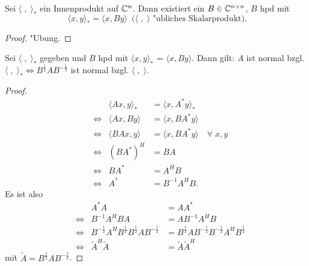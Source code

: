 %
\begin{lem}
 Sei $\langle \; , \; \rangle_*$ ein Innenprodukt auf  $\mathbb{C}^{n}$.
 Dann existiert ein $B \in \mathbb{C}^{n\times n}$, $B$ hpd mit
\[\langle x , y \rangle_* = \langle x,B y \rangle \enspace (\mbox{$\langle \; , \; \rangle$ "ubliches Skalarprodukt).} \]
\end{lem}
\begin{proof}
 "Ubung.
\end{proof}
%
\begin{sa}
 Sei $\langle \; , \; \rangle_*$ gegeben und $B$ hpd mit $\langle x, y \rangle_*$ = $\langle x, By\rangle$. Dann gilt:  $A$ ist normal bzgl.
$\langle \; , \; \rangle_* \Longleftrightarrow B^{\frac{1}{2}}AB^{-\frac{1}{2}} $ ist normal bzgl. $\langle \; , \; \rangle$.
\end{sa}
\begin{proof}
 \begin{align*}
  && \langle Ax, y\rangle_*  & = \langle x, A^*y\rangle_* \\
  & \Longleftrightarrow &  \langle Ax, By\rangle & =  \langle x, BA^*y\rangle \\
  & \Longleftrightarrow &  \langle BAx, y\rangle & =  \langle x, BA^*y\rangle \quad \forall \; x,y \\
  & \Longleftrightarrow  & (BA^*)^H   & =  BA   \\
  & \Longleftrightarrow  & BA^* & =  A^HB  \\
  & \Longleftrightarrow & A^* & = B^{-1}A^HB.
 \end{align*}
Es ist also
 \begin{align*}
  && A^*A & =AA^* \\
  & \Longleftrightarrow & B^{-1}A^HBA  & = AB^{-1} A^HB  \\
  & \Longleftrightarrow  & B^{-\frac{1}{2}}A^H B^{\frac{1}{2}}B^{\frac{1}{2}}AB^{-\frac{1}{2}}  & = B^{\frac{1}{2}}AB^{-\frac{1}{2}}B^{-\frac{1}{2}}A^HB^{\frac{1}{2}}   \\
  & \Longleftrightarrow  & \tilde{A}^H \tilde{A}  & = \tilde{A} \tilde{A}^H
 \end{align*}
mit $\tilde{A}=B^{\frac{1}{2}}AB^{-\frac{1}{2}}$.
\end{proof}
%

\medskip

